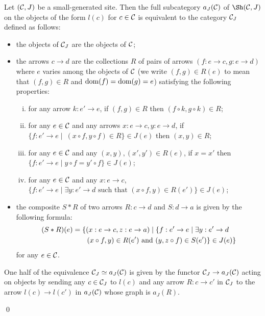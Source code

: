 \documentclass[a4paper,12pt]{article}
\begin{document}
\begin{corollary}\label{corfullsubcategorytopos}
	Let $({\cal C}, J)$ be a small-generated site. Then the full subcategory $a_{J}({\cal C})$ of $\Sh({\cal C}, J)$ on the objects of the form $l(c)$ for $c\in {\cal C}$ is equivalent to the category ${\cal C}_{J}$ defined as follows: 
	\begin{itemize}
		\item the objects of ${\cal C}_{J}$ are the objects of $\cal C$; 
		
		\item the arrows $c\to d$ are the collections $R$ of pairs of arrows $(f:e\to c,g:e\to d)$ where $e$ varies among the objects of $\cal C$ (we write $(f, g)\in R(e)$ to mean that $(f, g)\in R$ and $\textup{dom}(f)=\textup{dom}(g)=e$) satisfying the following properties:
		
		\begin{enumerate}[(i)]
			\item for any arrow $k:e'\to e$, if $(f,g)\in R$ then $(f\circ k, g\circ k)\in R$; 
			
			\item for any $e\in {\cal C}$ and any arrows $x:e\to c, y:e\to d$, if $\{f:e'\to e \mid\ (x\circ f, y\circ f)\in R\}\in J(e)$ then $(x, y)\in R$; 
			
			\item for any $e\in {\cal C}$ and any $(x, y), (x', y')\in R(e)$, if $x=x'$ then $\{f:e'\to e \mid y\circ f=y'\circ f\}\in J(e)$;
			
			\item for any $e\in {\cal C}$ and any $x:e\to c$, $\{f:e'\to e \mid \exists y:e'\to d \text{ such that } (x\circ f, y)\in R(e') \}\in J(e)$;
		\end{enumerate}
		
		\item the composite $S\ast R$ of two arrows $R:c\to d$ and $S:d\to a$ is given by the following formula: 
		\begin{equation*}\begin{split}
		(S\ast R)(e)&=\{(x:e\to c, z:e\to a) \mid \{f:e'\to e \mid \exists y:e'\to d\, \\
		& \quad\quad(x\circ f, y)\in R(e')\textup{ and } (y, z\circ f)\in S(e')\}\in J(e) \}
		\end{split}\end{equation*}
		for any $e\in {\cal C}$. 
	\end{itemize}
	
	One half of the equivalence ${\cal C}_{J}\simeq a_{J}({\cal C})$ is given by the functor ${\cal C}_{J}\to a_{J}({\cal C})$ acting on objects by sending any $c\in {\cal C}_{J}$ to $l(c)$ and any arrow $R:c\to c'$ in ${\cal C}_{J}$ to the arrow $l(c)\to l(c')$ in $a_{J}({\cal C})$ whose graph is $a_{J}(R)$.   
	
\end{corollary}\qed
\end{document}
